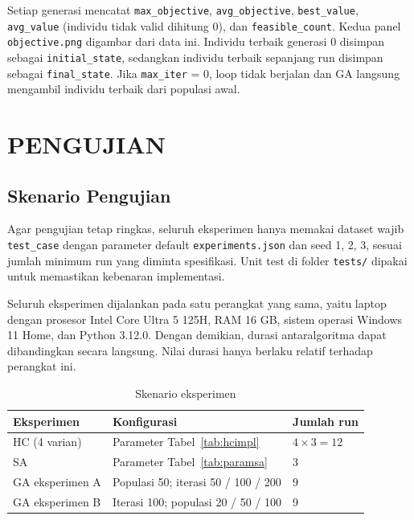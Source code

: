 \documentclass[12pt,a4paper]{report}
\newcommand{\hd}[1]{\cellcolor{hdr}\textbf{#1}}
\newcommand{\code}[1]{\texttt{\small #1}}
\begin{document}
Setiap generasi mencatat \code{max\_objective}, \code{avg\_objective}, \code{best\_value},
\code{avg\_value} (individu tidak valid dihitung 0), dan \code{feasible\_count}. Kedua panel
\code{objective.png} digambar dari data ini. Individu terbaik generasi 0 disimpan sebagai
\code{initial\_state}, sedangkan individu terbaik sepanjang run disimpan sebagai
\code{final\_state}. Jika \code{max\_iter} = 0, loop tidak berjalan dan GA langsung mengambil
individu terbaik dari populasi awal.

\chapter{PENGUJIAN}

\section{Skenario Pengujian}
Agar pengujian tetap ringkas, seluruh eksperimen hanya memakai dataset wajib \code{test\_case}
dengan parameter default \code{experiments.json} dan seed 1, 2, 3, sesuai jumlah minimum run yang
diminta spesifikasi. Unit test di folder \code{tests/} dipakai untuk memastikan kebenaran
implementasi.

Seluruh eksperimen dijalankan pada satu perangkat yang sama, yaitu laptop dengan prosesor
Intel Core Ultra 5 125H, RAM 16 GB, sistem operasi Windows 11 Home, dan Python 3.12.0.
Dengan demikian, durasi antaralgoritma dapat dibandingkan secara langsung. Nilai durasi hanya
berlaku relatif terhadap perangkat ini.

\begin{table}[H]
\centering
\caption{Skenario eksperimen}\label{tab:skenario}
\small
\begin{tabular}{|L{3.4cm}|L{6.4cm}|C{3cm}|}
\hline
\hd{Eksperimen} & \hd{Konfigurasi} & \hd{Jumlah run} \\ \hline
HC (4 varian) & Parameter Tabel~\ref{tab:hcimpl} & $4 \times 3 = 12$ \\ \hline
SA & Parameter Tabel~\ref{tab:paramsa} & 3 \\ \hline
GA eksperimen A & Populasi 50; iterasi 50 / 100 / 200 & 9 \\ \hline
GA eksperimen B & Iterasi 100; populasi 20 / 50 / 100 & 9 \\ \hline
\end{tabular}
\end{table}
\end{document}
